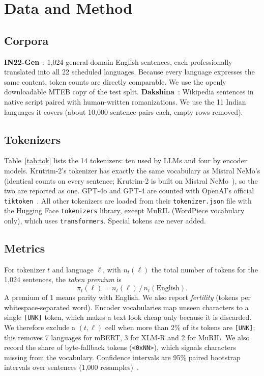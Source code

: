 \documentclass[conference]{IEEEtran}
\begin{document}
\section{Data and Method}
\subsection{Corpora}
\textbf{IN22-Gen}~\cite{gala2023}: 1,024 general-domain English sentences, each professionally translated into all 22 scheduled languages. Because every language expresses the same content, token counts are directly comparable. We use the openly downloadable MTEB copy of the test split.
\textbf{Dakshina}~\cite{roark2020}: Wikipedia sentences in native script paired with human-written romanizations. We use the 11 Indian languages it covers (about 10,000 sentence pairs each, empty rows removed).

\subsection{Tokenizers}
Table~\ref{tab:tok} lists the 14 tokenizers: ten used by LLMs and four by encoder models. Krutrim-2's tokenizer has exactly the same vocabulary as Mistral NeMo's (identical counts on every sentence; Krutrim-2 is built on Mistral NeMo~\cite{krutrim2,mistralnemo}), so the two are reported as one. GPT-4o and GPT-4 are counted with OpenAI's official \texttt{tiktoken}~\cite{tiktoken}. All other tokenizers are loaded from their \texttt{tokenizer.json} file with the Hugging Face \texttt{tokenizers} library, except MuRIL (WordPiece vocabulary only), which uses \texttt{transformers}. Special tokens are never added.

\subsection{Metrics}
For tokenizer $t$ and language $\ell$, with $n_t(\ell)$ the total number of tokens for the 1,024 sentences, the \emph{token premium} is
\begin{equation}
\pi_t(\ell) = n_t(\ell)\, /\, n_t(\text{English}).
\end{equation}
A premium of 1 means parity with English. We also report \emph{fertility} (tokens per whitespace-separated word). Encoder vocabularies map unseen characters to a single \texttt{[UNK]} token, which makes a text look cheap only because it is discarded. We therefore exclude a $(t,\ell)$ cell when more than 2\% of its tokens are \texttt{[UNK]}; this removes 7 languages for mBERT, 3 for XLM-R and 2 for MuRIL. We also record the share of byte-fallback tokens (\texttt{<0xNN>}), which signals characters missing from the vocabulary. Confidence intervals are 95\% paired bootstrap intervals over sentences (1,000 resamples)~\cite{efron1993}.
\end{document}
